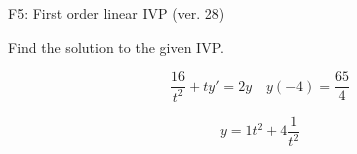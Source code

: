 \begin{exercise}
  \begin{exerciseTitle}F5: First order linear IVP (ver. 28)\end{exerciseTitle}
  \begin{exerciseStatement}
    
Find the solution to the given IVP.

    
\[\frac{16}{t^{2}} +ty'= 2 y \hspace{1em} y( -4 ) = \frac{65}{4}\]

  \end{exerciseStatement}
  \begin{exerciseAnswer}
    
\[y= 1 t^ 2 +4 \frac{1}{t^{2}}\]

  \end{exerciseAnswer}
\end{exercise}